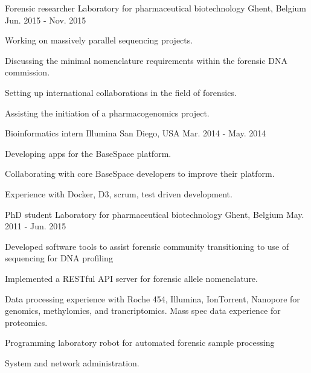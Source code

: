 \begin{cventries}
  \cventry
    {Forensic researcher} %
    {Laboratory for pharmaceutical biotechnology} %
    {Ghent, Belgium} %
    {Jun. 2015 - Nov. 2015} %
    {
      \begin{cvitems} %
        \item {Working on massively parallel sequencing projects.}
        \item {Discussing the minimal nomenclature requirements within
          the forensic DNA commission.}
        \item {Setting up international collaborations in the field of
            forensics.}
        \item {Assisting the initiation of a pharmacogenomics project.}
      \end{cvitems}
    }

  \cventry
    {Bioinformatics intern} %
    {Illumina} %
    {San Diego, USA} %
    {Mar. 2014 - May. 2014} %
    {
      \begin{cvitems} %
        \item {Developing apps for the BaseSpace platform.}
        \item {Collaborating with core BaseSpace developers to improve
            their platform.}
        \item {Experience with Docker, D3, scrum, test driven development.}
      \end{cvitems}
    }

  \cventry
    {PhD student } %
    {Laboratory for pharmaceutical biotechnology} %
    {Ghent, Belgium} %
    {May. 2011 - Jun. 2015} %
    {
      \begin{cvitems} %
        \item {Developed software tools to assist forensic community
            transitioning to use of sequencing for DNA profiling}
        \item {Implemented a RESTful API server for forensic allele
            nomenclature.}
        \item {Data processing experience with Roche 454, Illumina,
            IonTorrent, Nanopore for genomics, methylomics, and
            trancriptomics. Mass spec data experience for proteomics.}
        \item {Programming laboratory robot for automated forensic
            sample processing}
        \item {System and network administration.}
      \end{cvitems}
    }


\end{cventries}
